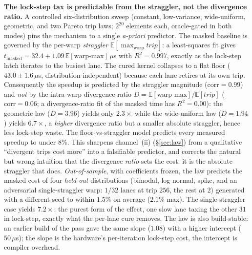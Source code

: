 \documentclass[sigplan,review,anonymous,10pt]{acmart}
\begin{document}
\textbf{The lock-step tax is predictable from the straggler, not the divergence ratio.} A controlled six-distribution sweep (constant, low-variance, wide-uniform, geometric, and two Pareto trip laws; $2^{20}$ elements each, oracle-gated in both modes) pins the mechanism to a single \emph{a-priori} predictor. The masked baseline is governed by the per-warp \emph{straggler} $\mathbb{E}[\max_{\mathrm{warp}}\mathit{trip}]$: a least-squares fit gives $t_{\mathrm{masked}}=32.4+1.09\,\mathbb{E}[\text{warp-max}]\,\mu$s with $R^2=0.997$, exactly as the lock-step latch iterates to the busiest lane. The cured kernel collapses to a flat floor ($43.0\pm1.6\,\mu$s, distribution-independent) because each lane retires at its own trip. Consequently the speedup is predicted by the straggler magnitude ($\mathrm{corr}=0.99$) and \emph{not} by the intra-warp divergence ratio $D=\mathbb{E}[\text{warp-max}]/\mathbb{E}[\mathit{trip}]$ ($\mathrm{corr}=0.06$; a divergence-ratio fit of the masked time has $R^2=0.00$): the geometric law ($D=3.96$) yields only $2.3\times$ while the wide-uniform law ($D=1.94$) yields $6.7\times$, a \emph{higher} divergence ratio but a smaller absolute straggler, hence less lock-step waste. The floor-vs-straggler model predicts every measured speedup to under $8\%$. This sharpens channel~(ii) (\S\ref{sec:law}) from a qualitative ``divergent trips cost more'' into a falsifiable predictor, and corrects the natural but wrong intuition that the divergence \emph{ratio} sets the cost: it is the absolute straggler that does. \emph{Out-of-sample}, with coefficients frozen, the law predicts the masked cost of four \emph{held-out} distributions (bimodal, log-normal, spike, and an adversarial single-straggler warp: $1/32$ lanes at trip $256$, the rest at $2$) generated with a different seed to within $1.5\%$ on average ($2.1\%$ max). The single-straggler case yields $7.2\times$: the purest form of the effect, one slow lane taxing the other $31$ in lock-step, exactly what the per-lane cure removes. The law is also build-stable: an earlier build of the
pass gave the same slope ($1.08$) with a higher intercept ($50\,\mu$s); the slope is the hardware's
per-iteration lock-step cost, the intercept is compiler overhead.
\end{document}
